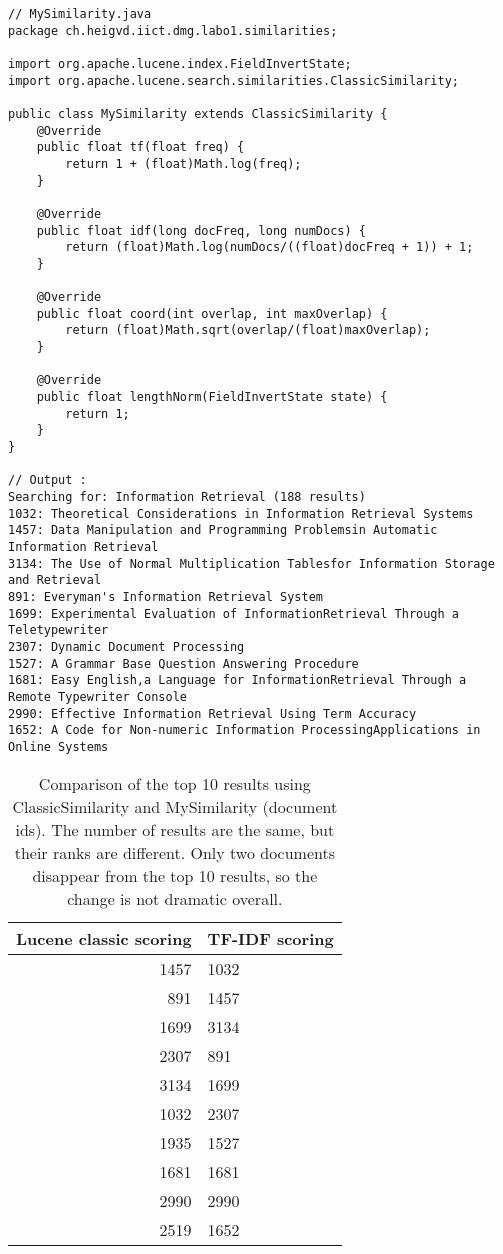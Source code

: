 \documentclass[11pt,a4paper,twoside,svgnames]{article}
\begin{document}
\begin{lstlisting}
// MySimilarity.java
package ch.heigvd.iict.dmg.labo1.similarities;

import org.apache.lucene.index.FieldInvertState;
import org.apache.lucene.search.similarities.ClassicSimilarity;

public class MySimilarity extends ClassicSimilarity {
	@Override
	public float tf(float freq) {
		return 1 + (float)Math.log(freq);
	}
	
	@Override
	public float idf(long docFreq, long numDocs) {
		return (float)Math.log(numDocs/((float)docFreq + 1)) + 1;
	}
	
	@Override
	public float coord(int overlap, int maxOverlap) {
		return (float)Math.sqrt(overlap/(float)maxOverlap);
	}
	
	@Override
	public float lengthNorm(FieldInvertState state) {
		return 1;
	}
}

// Output :
Searching for: Information Retrieval (188 results)
1032: Theoretical Considerations in Information Retrieval Systems
1457: Data Manipulation and Programming Problemsin Automatic Information Retrieval
3134: The Use of Normal Multiplication Tablesfor Information Storage and Retrieval
891: Everyman's Information Retrieval System
1699: Experimental Evaluation of InformationRetrieval Through a Teletypewriter
2307: Dynamic Document Processing
1527: A Grammar Base Question Answering Procedure
1681: Easy English,a Language for InformationRetrieval Through a Remote Typewriter Console
2990: Effective Information Retrieval Using Term Accuracy
1652: A Code for Non-numeric Information ProcessingApplications in Online Systems
\end{lstlisting}	


\begin{table}[]
	\begin{center}
	\begin{tabular}{r|l}
	Lucene classic scoring	& TF-IDF scoring \\\hline
	1457 & 1032\\
	891 & 1457\\
	1699 & 3134\\
	2307 & 891\\
	3134 & 1699\\
	1032 & 2307\\
	1935 & 1527\\
	1681 & 1681\\
	2990 & 2990\\
	2519 & 1652
	\end{tabular}
	\caption{Comparison of the top 10 results using ClassicSimilarity and MySimilarity (document ids). The number of results are the same, but their ranks are different. Only two documents disappear from the top 10 results, so the change is not dramatic overall.}
	\end{center}
\end{table}
\end{document}
